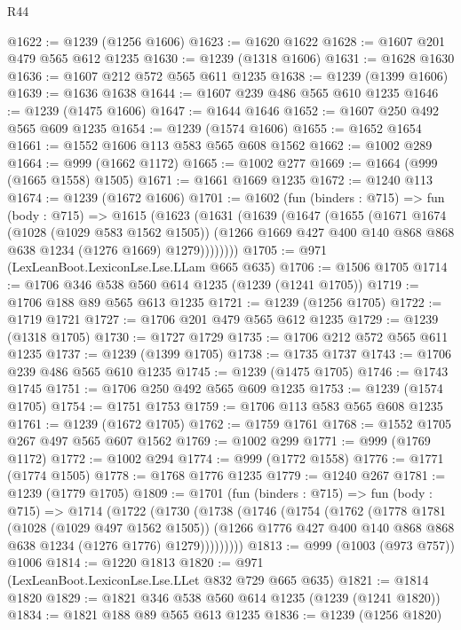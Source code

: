\begin{lexlean}{R44}
\begin{coremodule}
@1622 := @1239 (@1256 @1606)
@1623 := @1620 @1622
@1628 := @1607 @201 @479 @565 @612 @1235
@1630 := @1239 (@1318 @1606)
@1631 := @1628 @1630
@1636 := @1607 @212 @572 @565 @611 @1235
@1638 := @1239 (@1399 @1606)
@1639 := @1636 @1638
@1644 := @1607 @239 @486 @565 @610 @1235
@1646 := @1239 (@1475 @1606)
@1647 := @1644 @1646
@1652 := @1607 @250 @492 @565 @609 @1235
@1654 := @1239 (@1574 @1606)
@1655 := @1652 @1654
@1661 := @1552 @1606 @113 @583 @565 @608 @1562
@1662 := @1002 @289
@1664 := @999 (@1662 @1172)
@1665 := @1002 @277
@1669 := @1664 (@999 (@1665 @1558) @1505)
@1671 := @1661 @1669 @1235
@1672 := @1240 @113
@1674 := @1239 (@1672 @1606)
@1701 := @1602
    (fun (binders : @715) =>
    fun (body : @715) =>
    @1615
      (@1623
        (@1631
          (@1639
            (@1647
              (@1655
                (@1671
                  @1674
                  (@1028 (@1029 @583 @1562 @1505))
                  (@1266 @1669 @427 @400 @140 @868 @868 @638 @1234 (@1276 @1669) @1279))))))))
@1705 := @971 (LexLeanBoot.LexiconLse.Lse.LLam @665 @635)
@1706 := @1506 @1705
@1714 := @1706 @346 @538 @560 @614 @1235 (@1239 (@1241 @1705))
@1719 := @1706 @188 @89 @565 @613 @1235
@1721 := @1239 (@1256 @1705)
@1722 := @1719 @1721
@1727 := @1706 @201 @479 @565 @612 @1235
@1729 := @1239 (@1318 @1705)
@1730 := @1727 @1729
@1735 := @1706 @212 @572 @565 @611 @1235
@1737 := @1239 (@1399 @1705)
@1738 := @1735 @1737
@1743 := @1706 @239 @486 @565 @610 @1235
@1745 := @1239 (@1475 @1705)
@1746 := @1743 @1745
@1751 := @1706 @250 @492 @565 @609 @1235
@1753 := @1239 (@1574 @1705)
@1754 := @1751 @1753
@1759 := @1706 @113 @583 @565 @608 @1235
@1761 := @1239 (@1672 @1705)
@1762 := @1759 @1761
@1768 := @1552 @1705 @267 @497 @565 @607 @1562
@1769 := @1002 @299
@1771 := @999 (@1769 @1172)
@1772 := @1002 @294
@1774 := @999 (@1772 @1558)
@1776 := @1771 (@1774 @1505)
@1778 := @1768 @1776 @1235
@1779 := @1240 @267
@1781 := @1239 (@1779 @1705)
@1809 := @1701
    (fun (binders : @715) =>
    fun (body : @715) =>
    @1714
      (@1722
        (@1730
          (@1738
            (@1746
              (@1754
                (@1762
                  (@1778
                    @1781
                    (@1028 (@1029 @497 @1562 @1505))
                    (@1266 @1776 @427 @400 @140 @868 @868 @638 @1234 (@1276 @1776) @1279)))))))))
@1813 := @999 (@1003 (@973 @757)) @1006
@1814 := @1220 @1813
@1820 := @971 (LexLeanBoot.LexiconLse.Lse.LLet @832 @729 @665 @635)
@1821 := @1814 @1820
@1829 := @1821 @346 @538 @560 @614 @1235 (@1239 (@1241 @1820))
@1834 := @1821 @188 @89 @565 @613 @1235
@1836 := @1239 (@1256 @1820)

\end{coremodule}
\end{lexlean}

